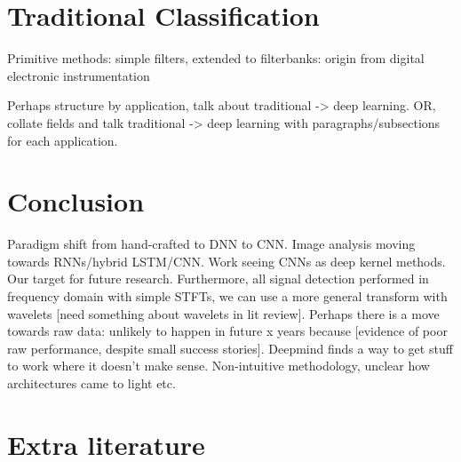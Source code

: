 \documentclass[12pt]{llncs}
\begin{document}
\section{Traditional Classification}
\label{sec:traditional}

Primitive methods: simple filters, extended to filterbanks: origin from digital electronic instrumentation



Perhaps structure by application, talk about traditional -> deep learning. OR, collate fields and talk traditional -> deep learning with paragraphs/subsections for each application.


\section{Conclusion}
\label{sec:litreviewconclusion}
Paradigm shift from hand-crafted to DNN to CNN. Image analysis moving towards RNNs/hybrid LSTM/CNN. Work seeing CNNs as deep kernel methods. Our target for future research. Furthermore, all signal detection performed in frequency domain with simple STFTs, we can use a more general transform with wavelets [need something about wavelets in lit review]. Perhaps there is a move towards raw data: unlikely to happen in future x years because [evidence of poor raw performance, despite small success stories]. Deepmind finds a way to get stuff to work where it doesn't make sense. Non-intuitive methodology, unclear how architectures came to light etc.


\section{Extra literature}
\cite{mcvicar2016learning}
\end{document}
